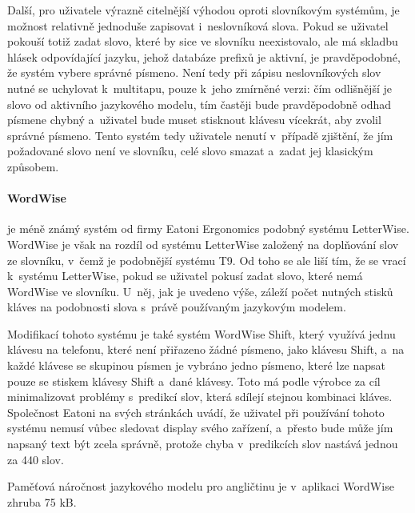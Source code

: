 \documentclass[a4paper,11pt,openany]{book} %
\begin{document}
Další, pro uživatele výrazně citelnější výhodou oproti slovníkovým systémům, je možnost relativně jednoduše zapisovat i~neslovníková slova. Pokud se uživatel pokouší totiž zadat slovo, které by sice ve slovníku neexistovalo, ale má skladbu hlásek odpovídající jazyku, jehož databáze prefixů je aktivní, je pravděpodobné, že systém vybere správné písmeno. Není tedy při zápisu neslovníkových slov nutné se uchylovat k~multitapu, pouze k~jeho zmírněné verzi: čím odlišnější je slovo od aktivního jazykového modelu, tím častěji bude pravděpodobně odhad písmene chybný a~uživatel bude muset stisknout klávesu vícekrát, aby zvolil správné písmeno. Tento systém tedy uživatele nenutí v~případě zjištění, že jím požadované slovo není ve slovníku, celé slovo smazat a~zadat jej klasickým způsobem. \parencite[5234]{ghayoomi2009overview} \parencite[112]{MacKenzie2001} 

\paragraph{WordWise}

je méně známý systém od firmy Eatoni Ergonomics podobný systému LetterWise. WordWise je však na rozdíl od systému LetterWise založený na doplňování slov ze slovníku, v~čemž je podobnější systému T9. Od toho se ale liší tím, že se vrací k~systému LetterWise, pokud se uživatel pokusí zadat slovo, které nemá WordWise ve slovníku. U~něj, jak je uvedeno výše, záleží počet nutných stisků kláves na podobnosti slova s~právě používaným jazykovým modelem. \parencite{eatoniwordwise}

Modifikací tohoto systému je také systém WordWise Shift, který využívá jednu klávesu na telefonu, které není přiřazeno žádné písmeno, jako klávesu Shift, a~na každé klávese se skupinou písmen je vybráno jedno písmeno, které lze napsat pouze se stiskem klávesy Shift a~dané klávesy. Toto má podle výrobce za cíl minimalizovat problémy s~predikcí slov, která sdílejí stejnou kombinaci kláves. Společnost Eatoni na svých stránkách uvádí, že uživatel při používání tohoto systému nemusí vůbec sledovat display svého zařízení, a~přesto bude může jím napsaný text být zcela správně, protože chyba v~predikcích slov nastává jednou za 440 slov. \parencite{eatoniwordwise}

Paměťová náročnost jazykového modelu pro angličtinu je v~aplikaci WordWise zhruba 75 kB. \parencite{eatoniwordwise} %
\end{document}
